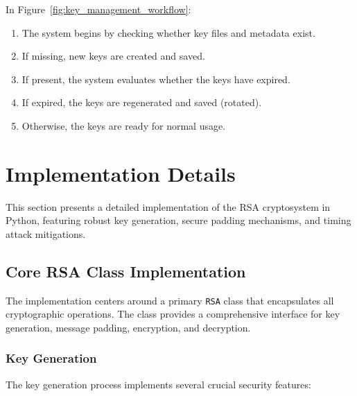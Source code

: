 \documentclass[12pt]{article}
\begin{document}
In Figure~\ref{fig:key_management_workflow}:
\begin{enumerate}
    \item The system begins by checking whether key files and metadata exist.
    \item If missing, new keys are created and saved.
    \item If present, the system evaluates whether the keys have expired.
    \item If expired, the keys are regenerated and saved (rotated).
    \item Otherwise, the keys are ready for normal usage.
\end{enumerate}


\section{Implementation Details}
This section presents a detailed implementation of the RSA cryptosystem in Python, featuring robust key generation, secure padding mechanisms, and timing attack mitigations.

\subsection{Core RSA Class Implementation}
The implementation centers around a primary \texttt{RSA} class that encapsulates all cryptographic operations. The class provides a comprehensive interface for key generation, message padding, encryption, and decryption.

\subsubsection{Key Generation}
The key generation process implements several crucial security features:
\end{document}
